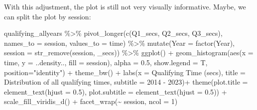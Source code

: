\documentclass[
]{book}
\newenvironment{Shaded}{\begin{snugshade}}{\end{snugshade}}
\newcommand{\AttributeTok}[1]{\textcolor[rgb]{0.77,0.63,0.00}{#1}}
\newcommand{\DecValTok}[1]{\textcolor[rgb]{0.00,0.00,0.81}{#1}}
\newcommand{\FloatTok}[1]{\textcolor[rgb]{0.00,0.00,0.81}{#1}}
\newcommand{\FunctionTok}[1]{\textcolor[rgb]{0.00,0.00,0.00}{#1}}
\newcommand{\NormalTok}[1]{#1}
\newcommand{\SpecialCharTok}[1]{\textcolor[rgb]{0.00,0.00,0.00}{#1}}
\newcommand{\StringTok}[1]{\textcolor[rgb]{0.31,0.60,0.02}{#1}}
\begin{document}
With this adjustment, the plot is still not very visually informative. Maybe, we can split the plot by session:

\begin{Shaded}
\begin{Highlighting}[]
\NormalTok{qualifying\_allyears }\SpecialCharTok{\%\textgreater{}\%}
  \FunctionTok{pivot\_longer}\NormalTok{(}\FunctionTok{c}\NormalTok{(}\StringTok{\textquotesingle{}Q1\_secs\textquotesingle{}}\NormalTok{, }\StringTok{\textquotesingle{}Q2\_secs\textquotesingle{}}\NormalTok{, }\StringTok{\textquotesingle{}Q3\_secs\textquotesingle{}}\NormalTok{),}
               \AttributeTok{names\_to =} \StringTok{\textquotesingle{}session\textquotesingle{}}\NormalTok{,}
               \AttributeTok{values\_to =} \StringTok{\textquotesingle{}time\textquotesingle{}}\NormalTok{) }\SpecialCharTok{\%\textgreater{}\%}
  \FunctionTok{mutate}\NormalTok{(}\AttributeTok{Year =} \FunctionTok{factor}\NormalTok{(Year),}
         \AttributeTok{session =} \FunctionTok{str\_remove}\NormalTok{(session, }\StringTok{\textquotesingle{}\_secs\textquotesingle{}}\NormalTok{)) }\SpecialCharTok{\%\textgreater{}\%}
  \FunctionTok{ggplot}\NormalTok{() }\SpecialCharTok{+}
  \FunctionTok{geom\_histogram}\NormalTok{(}\FunctionTok{aes}\NormalTok{(}\AttributeTok{x =}\NormalTok{ time, }\AttributeTok{y =}\NormalTok{ ..density.., }\AttributeTok{fill =}\NormalTok{ session),}
                 \AttributeTok{alpha =} \FloatTok{0.5}\NormalTok{, }\AttributeTok{show.legend =}\NormalTok{ T,}
                 \AttributeTok{position=}\StringTok{"identity"}\NormalTok{) }\SpecialCharTok{+}
  \FunctionTok{theme\_bw}\NormalTok{() }\SpecialCharTok{+}
  \FunctionTok{labs}\NormalTok{(}\AttributeTok{x =} \StringTok{\textquotesingle{}Qualifying Time (secs)\textquotesingle{}}\NormalTok{,}
       \AttributeTok{title =} \StringTok{\textquotesingle{}Distribution of all qualifying times\textquotesingle{}}\NormalTok{,}
       \AttributeTok{subtitle =} \StringTok{\textquotesingle{}2014 {-} 2023\textquotesingle{}}\NormalTok{)}\SpecialCharTok{+}
  \FunctionTok{theme}\NormalTok{(}\AttributeTok{plot.title =} \FunctionTok{element\_text}\NormalTok{(}\AttributeTok{hjust =} \FloatTok{0.5}\NormalTok{),}
        \AttributeTok{plot.subtitle =} \FunctionTok{element\_text}\NormalTok{(}\AttributeTok{hjust =} \FloatTok{0.5}\NormalTok{)) }\SpecialCharTok{+}
  \FunctionTok{scale\_fill\_viridis\_d}\NormalTok{() }\SpecialCharTok{+}
  \FunctionTok{facet\_wrap}\NormalTok{(}\SpecialCharTok{\textasciitilde{}}\NormalTok{ session, }\AttributeTok{ncol =} \DecValTok{1}\NormalTok{)}
\end{Highlighting}
\end{Shaded}
\end{document}
